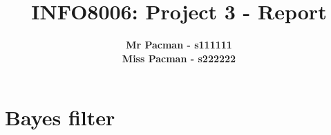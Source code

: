 \documentclass{article}
\begin{document}

\title{\Large{INFO8006: Project 3 - Report}}
\vspace{1cm}
\author{\small{\bf Mr Pacman - s111111} \\ \small{\bf Miss Pacman - s222222}}

\maketitle


\section{Bayes filter}
\end{document}

